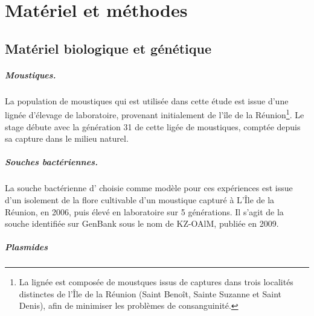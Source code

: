 \chapter{Matériel et méthodes}

\section{Matériel biologique et génétique}

\paragraph{Moustiques.}
\label{par:moustiques}
La population de moustiques  qui est utilisée dans cette étude est issue d'une lignée d'élevage de laboratoire, provenant initialement de l'île de la Réunion\footnote{La lignée est composée de moustques issus de captures dans trois localités distinctes de l'Île de la Réunion (Saint Benoît, Sainte Suzanne et Saint Denis), afin de minimiser les problèmes de consanguinité.}.
Le stage débute avec la génération 31 de cette ligée de moustiques, comptée depuis sa capture dans le milieu naturel.

\paragraph{Souches bactériennes.}
La souche bactérienne d' choisie comme modèle pour ces expériences est issue d'un isolement de la flore cultivable d'un moustique capturé à L'Île de la Réunion, en 2006, puis élevé en laboratoire sur 5 générations.
Il s'agit de la souche identifiée sur GenBank sous le nom de KZ-OAlM, publiée en 2009\cite{zouache2009}.

\paragraph{Plasmides}


